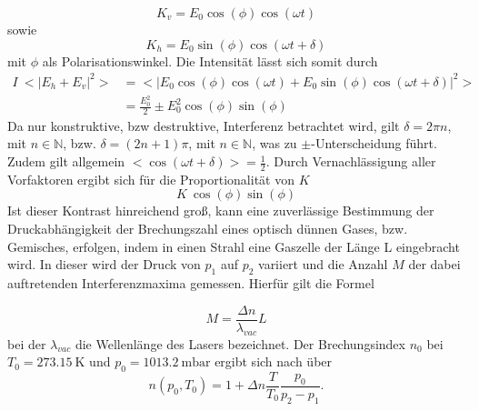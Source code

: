 \begin{equation}
	K_v = E_0 \cos (\phi) \cos(\omega t)
\end{equation}
sowie
\begin{equation}
	K_h = E_0 \sin(\phi) \cos(\omega t + \delta)
\end{equation}
mit $\phi$ als Polarisationswinkel. Die Intensität lässt sich somit durch
\begin{align*}
	I ~ <|E_h+E_v|^2> &=<| E_0 \cos (\phi) \cos(\omega t) +  E_0 \sin(\phi) \cos(\omega t + \delta)|^2> \\
			       &= \frac{E_0^2}{2} \pm E_0^2 \cos(\phi)\sin(\phi)
\end{align*}
Da nur konstruktive, bzw destruktive, Interferenz betrachtet wird, gilt $\delta = 2\pi n$, mit $n \in \mathbb{N}$, bzw. $\delta = (2n+1)\pi$, mit $n \in \mathbb{N}$, was zu $\pm$-Unterscheidung führt. Zudem gilt allgemein $<\cos(\omega t + \delta)> = \frac{1}{2}$.
Durch Vernachlässigung aller Vorfaktoren ergibt sich für die Proportionalität von $K$
\begin{equation}
	K ~ \cos(\phi)\sin(\phi)
\end{equation}
Ist dieser Kontrast hinreichend groß, kann eine zuverlässige Bestimmung der Druckabhängigkeit der Brechungszahl eines optisch dünnen Gases, bzw. Gemisches, erfolgen, indem in einen Strahl eine Gaszelle der Länge L eingebracht wird. In dieser wird der Druck von $p_1$ auf $p_2$ variiert und die Anzahl $M$ der dabei auftretenden Interferenzmaxima gemessen. Hierfür gilt die Formel

\begin{equation}
	M = \frac{\Delta n}{\lambda_{vac}} L
\end{equation}
bei der $\lambda_{vac}$ die Wellenlänge des Lasers bezeichnet.
Der Brechungsindex $n_0$ bei $T_0 = \SI{273,15}{\kelvin}$ und $p_0 =  \SI{1013,2}{\milli\bar}$ ergibt sich nach \cite{Anleitung} über
\begin{equation}
	n(p_0,T_0)=1+ \Delta n \frac{T}{T_0} \frac{p_0}{p_2-p_1}.
	\label{eqn:n0}
\end{equation}


